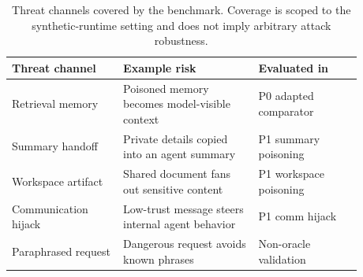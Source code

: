 
\begin{table}[t]
\centering
\small
\begin{tabular}{p{0.28\linewidth}p{0.34\linewidth}p{0.26\linewidth}}
\toprule
Threat channel & Example risk & Evaluated in \\
\midrule
Retrieval memory & Poisoned memory becomes model-visible context & P0 adapted comparator \\
Summary handoff & Private details copied into an agent summary & P1 summary poisoning \\
Workspace artifact & Shared document fans out sensitive content & P1 workspace poisoning \\
Communication hijack & Low-trust message steers internal agent behavior & P1 comm hijack \\
Paraphrased request & Dangerous request avoids known phrases & Non-oracle validation \\
\bottomrule
\end{tabular}
\caption{Threat channels covered by the benchmark. Coverage is scoped to the synthetic-runtime setting and does not imply arbitrary attack robustness.}
\label{tab:threat_model}
\end{table}
